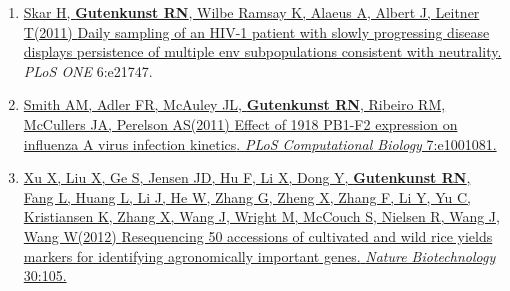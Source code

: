 \documentclass[11pt]{article}
\begin{document}
\begin{enumerate}
\item 
\href{http://doi.org/10.1371/journal.pone.0021747}{Skar H\equal, \textbf{Gutenkunst RN}\equal, {Wilbe Ramsay} K, Alaeus A, Albert J, Leitner T\corresponding (2011)
  {Daily sampling of an HIV-1 patient with slowly progressing disease displays
  persistence of multiple env subpopulations consistent with neutrality}.}
\newblock \emph{PLoS ONE} 6:e21747.

\item
\href{http://doi.org/10.1371/journal.pcbi.1001081}{Smith AM, Adler FR, McAuley JL, \textbf{Gutenkunst RN}, Ribeiro RM, McCullers JA,
  Perelson AS\corresponding (2011) {Effect of 1918 PB1-F2 expression on influenza A virus
  infection kinetics}.
\newblock \emph{PLoS Computational Biology} 7:e1001081.}



\item
\href{http://doi.org/10.1038/nbt.2050}{Xu X\equal, Liu X\equal, Ge S\equal, Jensen JD\equal, Hu F\equal, Li X\equal, Dong Y\equal, \textbf{Gutenkunst RN}, Fang L, Huang
  L, Li J, He W, Zhang G, Zheng X, Zhang F, Li Y, Yu C, Kristiansen K, Zhang X,
  Wang J, Wright M, McCouch S, Nielsen R\corresponding, Wang J\corresponding, Wang W\corresponding (2012) {Resequencing
  50 accessions of cultivated and wild rice yields markers for identifying
  agronomically important genes.}
\newblock \emph{Nature Biotechnology} 30:105.}




\end{enumerate}
\end{document}
